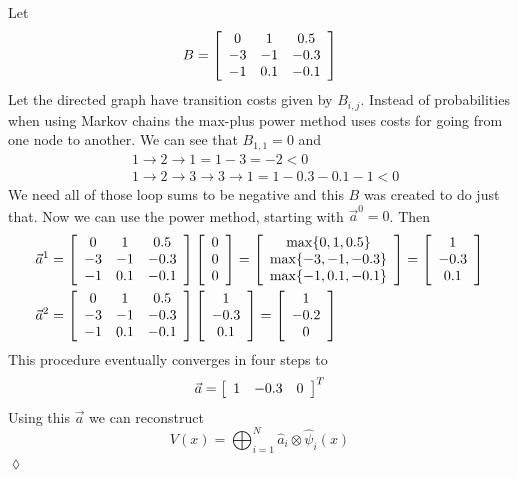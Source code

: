 \begin{example}
Let
$$B = \left[\begin{array}{c c c} 0 & 1 & 0.5 \\ -3 & -1 & -0.3 \\ -1 & 0.1 & -0.1 \end{array}\right]$$
Let the directed graph have transition costs given by $B_{i,j}$. Instead of probabilities when using Markov chains the max-plus power method uses costs for going from one node to another. We can see that $B_{1,1}=0$ and
\begin{align*}
&1\to2\to1 = 1-3 = -2<0 \\
&1\to2\to3\to3\to1 = 1-0.3-0.1-1 < 0
\end{align*}
We need all of those loop sums to be negative and this $B$ was created to do just that. Now we can use the power method, starting with $\vec{a}^0=0$. Then
\begin{align*}
\vec{a}^1 &= \left[\begin{array}{c c c} 0 & 1 & 0.5 \\ -3 & -1 & -0.3 \\ -1 & 0.1 & -0.1 \end{array}\right] \left[\begin{array}{c} 0 \\ 0 \\ 0 \end{array}\right] = \left[\begin{array}{c} \max\{0,1,0.5\} \\ \max\{-3,-1,-0.3\} \\ \max\{-1,0.1,-0.1\} \end{array}\right] = \left[\begin{array}{c} 1 \\ -0.3 \\ 0.1 \end{array}\right] \\
\vec{a}^2 &= \left[\begin{array}{c c c} 0 & 1 & 0.5 \\ -3 & -1 & -0.3 \\ -1 & 0.1 & -0.1 \end{array}\right] \left[\begin{array}{c} 1 \\ -0.3 \\ 0.1 \end{array}\right] = \left[\begin{array}{c} 1 \\ -0.2 \\ 0 \end{array}\right]
\end{align*}
This procedure eventually converges in four steps to
$$\vec{a} = \left[\begin{array}{c c c} 1 & -0.3 & 0 \end{array}\right]^T$$
Using this $\vec{a}$ we can reconstruct
$$V(x) = \bigoplus_{i=1}^N\hat{a}_i\otimes \hat{\psi}_i(x)$$
$\lozenge$
\end{example}
